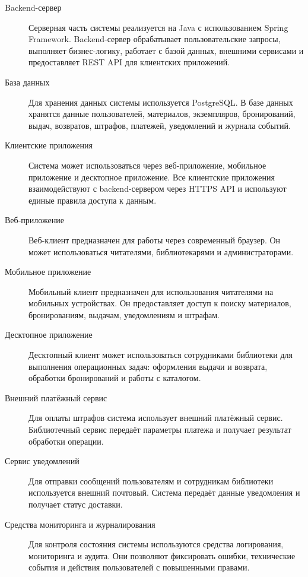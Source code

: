 \documentclass[12pt,a4paper]{article}
\begin{document}
	\begin{description}
		\item[Backend-сервер]
		Серверная часть системы реализуется на Java с использованием Spring Framework.
		Backend-сервер обрабатывает пользовательские запросы, выполняет бизнес-логику,
		работает с базой данных, внешними сервисами и предоставляет REST API для
		клиентских приложений.
		
		\item[База данных]
		Для хранения данных системы используется PostgreSQL. В базе данных хранятся
		данные пользователей, материалов, экземпляров, бронирований, выдач, возвратов,
		штрафов, платежей, уведомлений и журнала событий.
		
		\item[Клиентские приложения]
		Система может использоваться через веб-приложение, мобильное приложение и
		десктопное приложение. Все клиентские приложения взаимодействуют с backend-сервером
		через HTTPS API и используют единые правила доступа к данным.
		
		\item[Веб-приложение]
		Веб-клиент предназначен для работы через современный браузер. Он может
		использоваться читателями, библиотекарями и администраторами.
		
		\item[Мобильное приложение]
		Мобильный клиент предназначен для использования читателями на мобильных
		устройствах. Он предоставляет доступ к поиску материалов, бронированиям,
		выдачам, уведомлениям и штрафам.
		
		\item[Десктопное приложение]
		Десктопный клиент может использоваться сотрудниками библиотеки для выполнения
		операционных задач: оформления выдачи и возврата, обработки бронирований и
		работы с каталогом.
		
		\item[Внешний платёжный сервис]
		Для оплаты штрафов система использует внешний платёжный сервис. Библиотечный сервис
		передаёт параметры платежа и получает результат обработки операции.
		
		\item[Сервис уведомлений]
		Для отправки сообщений пользователям и сотрудникам библиотеки используется
		внешний почтовый. Система передаёт данные уведомления и получает
		статус доставки.
		
		\item[Средства мониторинга и журналирования]
		Для контроля состояния системы используются средства логирования, мониторинга
		и аудита. Они позволяют фиксировать ошибки, технические события и действия
		пользователей с повышенными правами.
	\end{description}
	
\end{document}
